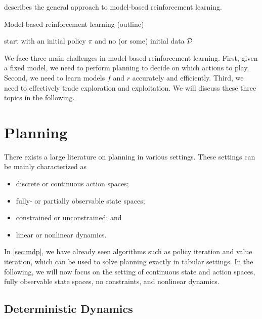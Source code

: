  describes the general approach to model-based reinforcement learning.

\begin{algorithm}[H]
  \caption{Model-based reinforcement learning (outline)}\label{alg:mbarl}
  start with an initial policy $\pi$ and no (or some) initial data $\mathcal{D}$\;
\end{algorithm}

We face three main challenges in model-based reinforcement learning.
First, given a fixed model, we need to perform planning to decide on which actions to play.
Second, we need to learn models $f$ and $r$ accurately and efficiently.
Third, we need to effectively trade exploration and exploitation.
We will discuss these three topics in the following.

\section{Planning}\label{sec:mbarl:planning}

There exists a large literature on planning in various settings.
These settings can be mainly characterized as \begin{itemize}
  \item discrete or continuous action spaces;
  \item fully- or partially observable state spaces;
  \item constrained or unconstrained; and
  \item linear or nonlinear dynamics.
\end{itemize}
In \cref{sec:mdp}, we have already seen algorithms such as policy iteration and value iteration, which can be used to solve planning exactly in tabular settings.
In the following, we will now focus on the setting of continuous state and action spaces, fully observable state spaces, no constraints, and nonlinear dynamics.

\subsection{Deterministic Dynamics}\label{sec:mbarl:planning:determinstic_dynamics}

